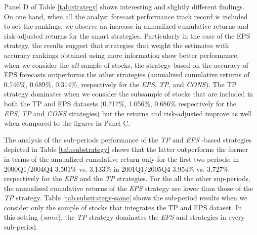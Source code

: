 \documentclass{article}\usepackage[]{graphicx}\usepackage[]{color}
\newcommand{\same}{\textit{same}}
\newcommand{\all}{\textit{all}}
\begin{document}
{Panel D of Table \ref{tab:strategy} shows interesting and slightly different findings. On one hand, when all the analyst forecast performance track record is included to set the rankings, we observe an increase in annualized cumulative returns and risk-adjusted returns for the smart strategies. Particularly in the case of the EPS strategy, the results suggest that strategies that weight the estimates with accuracy rankings obtained using more information show better performance: when we consider the \all{} sample of stocks, the strategy based on the accuracy of EPS forecasts outperforms the other strategies (annualized cumulative returns of 0.746\%, 0.689\%, 0.314\%, respectively for the \textit{EPS}, \textit{TP}, and \textit{CONS}). The TP strategy dominates when we consider the subsample of stocks that are included in both the TP and EPS datasets (0.717\%, 1.056\%, 0.686\% respectively for the \textit{EPS}, \textit{TP} and \textit{CONS} strategies) but the returns and risk-adjusted improve as well when compared to the figures in Panel C.  




The analysis of the sub-periods performance of the \textit{TP} and \textit{EPS} -based strategies depicted in Table \ref{tab:substrategy} shows that the latter outperforms the former in terms of the annualized cumulative return only for the first two periods: in  2000Q1/2004Q4  3.501\% vs. 3.133\%  in 2001Q1/2005Q4 3.954\%  vs. 3.727\% respectively for the \textit{EPS} and the \textit{TP} strategies. For the all the other sup-periods, the annualized cumulative returns of the \textit{EPS} strategy are lower than those of the \textit{TP} strategy. 
Table \ref{tab:substrategy-same} shows the sub-period results when we consider only the sample of stocks that integrates the TP and EPS dataset. In this setting (\same{}), the \textit{TP} strategy dominates the \textit{EPS} and  strategies in every sub-period. 


}
\end{document}
